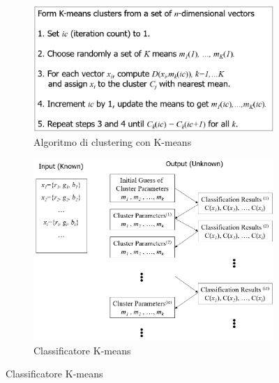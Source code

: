 \documentclass[a4paper,oneside,titlepage]{book}
\begin{document}
\begin{figure}[htp]
	\begin{subfigure}{0.49\textwidth}
	    \centering
		\includegraphics[width=\textwidth, height=\textheight, keepaspectratio]{k-means1.png}
		\caption{Algoritmo di clustering con K-means}
	\end{subfigure}
	\hfill
	\begin{subfigure}{0.49\textwidth}
	    \centering
		\includegraphics[width=\textwidth, height=\textheight, keepaspectratio]{k-means2.png}
		\caption{Classificatore K-means}
	\end{subfigure}
\end{figure}
\end{document}
